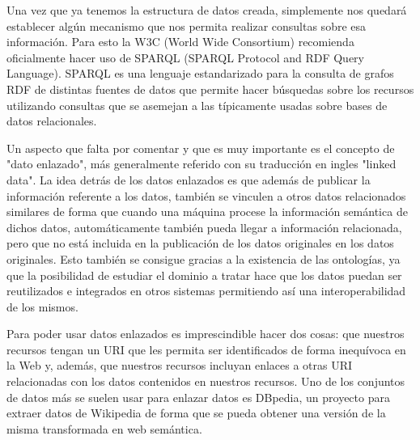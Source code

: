 \bigskip
Una vez que ya tenemos la estructura de datos creada, simplemente nos quedará establecer algún mecanismo que nos permita realizar consultas sobre esa información. Para esto la W3C (World Wide Consortium) recomienda oficialmente hacer uso de SPARQL (SPARQL Protocol and RDF Query Language). SPARQL es una lenguaje estandarizado para la consulta de grafos RDF de distintas fuentes de datos que permite hacer búsquedas sobre los recursos utilizando consultas que se asemejan a las típicamente usadas sobre bases de datos relacionales.

\bigskip

Un aspecto que falta por comentar y que es muy importante es el concepto de "dato enlazado", más generalmente referido con su traducción en ingles "linked data". La idea detrás de los datos enlazados es que además de publicar la información referente a los datos, también se vinculen a otros datos relacionados similares de forma que cuando una máquina procese la información semántica de dichos datos, automáticamente también pueda llegar a información relacionada, pero que no está incluida en la publicación de los datos originales en los datos originales. Esto también se consigue gracias a la existencia de las ontologías, ya que la posibilidad de estudiar el dominio a tratar hace que los datos puedan ser reutilizados e integrados en otros sistemas permitiendo así una interoperabilidad de los mismos.

\bigskip
Para poder usar datos enlazados es imprescindible hacer dos cosas: que nuestros recursos tengan un URI que les permita ser identificados de forma inequívoca en la Web y, además, que nuestros recursos incluyan enlaces a otras URI relacionadas con los datos contenidos en nuestros recursos. Uno de los conjuntos de datos más se suelen usar para enlazar datos es DBpedia, un proyecto para extraer datos de Wikipedia de forma que se pueda obtener una versión de la misma transformada en web semántica.


